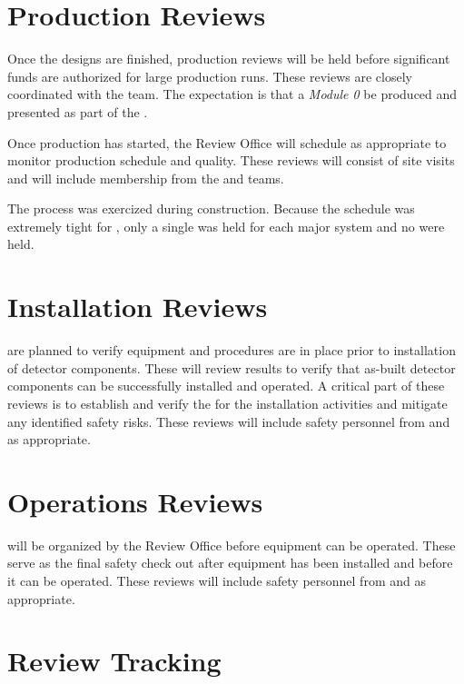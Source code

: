 \section{Production Reviews}

Once the designs are finished, production reviews will be held before
significant funds are authorized for large production runs. These
reviews are closely coordinated with the  team. The
expectation is that a \textit{Module 0} be produced and presented as
part of the .

Once production has started, the Review Office will schedule  as
appropriate to monitor production schedule and quality. These reviews
will consist of site visits and will include membership from the
 and  teams.

The  process was exercized during 
construction. Because the schedule was extremely tight for
, only a single  was held for each major
system and no  were held.


\section{Installation Reviews}

 are planned to verify equipment and procedures are in
place prior to installation of detector components. These will
review  results to verify that as-built detector
components can be successfully installed and operated. A critical part
of these reviews is to establish and verify the  for the
installation activities and mitigate any identified safety risks.  These reviews
will include safety personnel from  and  as
appropriate.


\section{Operations Reviews}

 will be organized by the Review Office before equipment
can be operated.  These serve as the final safety check out after
equipment has been installed and before it can be operated. These
reviews will include safety personnel from  and
 as appropriate.

\section{Review Tracking}

